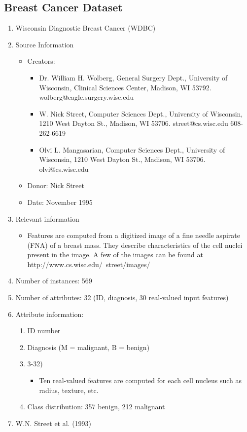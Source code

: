 \documentclass[letterpaper, 11pt]{article}
\begin{document}
\subsection{Breast Cancer Dataset}
\begin{enumerate}
    \item Wisconsin Diagnostic Breast Cancer (WDBC)
    \item Source Information
    \begin{itemize}
        \item Creators:
        \begin{itemize}
            \item Dr. William H. Wolberg, General Surgery Dept., University of Wisconsin,  Clinical Sciences Center, Madison, WI 53792. wolberg@eagle.surgery.wisc.edu
            \item W. Nick Street, Computer Sciences Dept., University of Wisconsin, 1210 West Dayton St., Madison, WI 53706. street@cs.wisc.edu  608-262-6619
            \item Olvi L. Mangasarian, Computer Sciences Dept., University of Wisconsin, 1210 West Dayton St., Madison, WI 53706. olvi@cs.wisc.edu
        \end{itemize}
        \item Donor: Nick Street
        \item Date: November 1995
    \end{itemize}
    \item Relevant information
    \begin{itemize}
        \item Features are computed from a digitized image of a fine needle aspirate (FNA) of a breast mass.  They describe characteristics of the cell nuclei present in the image. A few of the images can be found at http://www.cs.wisc.edu/~street/images/
    \end{itemize}
    \item Number of instances: 569
    \item Number of attributes: 32 (ID, diagnosis, 30 real-valued input features)
    \item Attribute information:
    \begin{enumerate}
        \item ID number
        \item Diagnosis (M = malignant, B = benign)
        \item 3-32)
        \begin{itemize}
            \item Ten real-valued features are computed for each cell nucleus such as radius, texture, etc.
        \end{itemize}
        \item Class distribution: 357 benign, 212 malignant
    \end{enumerate}
    \item W.N. Street et al. (1993)
\end{enumerate}
\end{document}
